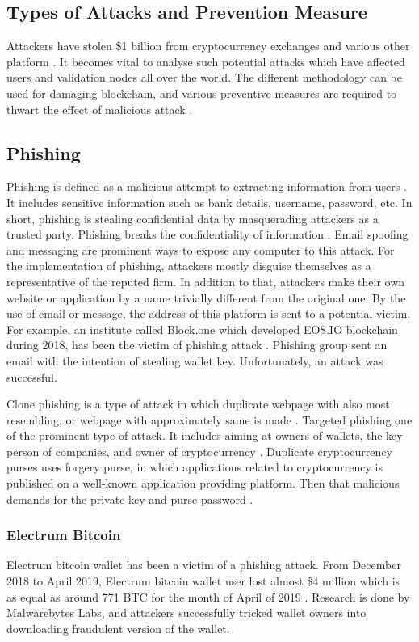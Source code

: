 \documentclass[a4paper,twoside,12pt]{report}
\begin{document}
\begin{spacing}{1.5}
\section{Types of Attacks and Prevention Measure}
\label{typesofattacks}
Attackers have stolen \$1 billion from cryptocurrency exchanges and various other platform \cite{topfiveblockchainsecurityissues}. It becomes vital to analyse such potential attacks which have affected users and validation nodes all over the world. The different methodology can be used for damaging blockchain, and various preventive measures are required to thwart the effect of malicious attack \cite{blockchainthreatreport}. 
\subsection{Phishing}
Phishing is defined as a malicious attempt to extracting information from users \cite{wiki:phishing}. It includes sensitive information such as bank details, username, password, etc. In short, phishing is stealing confidential data by masquerading attackers as a trusted party. Phishing breaks the confidentiality of information \cite{andryukhinphishing}. Email spoofing and messaging are prominent ways to expose any computer to this attack. For the implementation of phishing, attackers mostly disguise themselves as a representative of the reputed firm. In addition to that, attackers make their own website or application by a name trivially different from the original one. By the use of email or message, the address of this platform is sent to a potential victim. For example, an institute called Block.one which developed EOS.IO blockchain during 2018, has been the victim of phishing attack \cite{wiki:phishing}. Phishing group sent an email with the intention of stealing wallet key. Unfortunately, an attack was successful. 
\par
Clone phishing is a type of attack in which duplicate webpage with also most resembling, or webpage with approximately same is made \cite{andryukhinphishing,phishingkaspersky}. Targeted phishing one of the prominent type of attack. It includes aiming at owners of wallets, the key person of companies, and owner of cryptocurrency \cite{aimedphising,andryukhinphishing}. Duplicate cryptocurrency purses uses forgery purse, in which applications related to cryptocurrency is published on a well-known application providing platform. Then that malicious demands for the private key and purse password \cite{andryukhinphishing}.          
\subsubsection{Electrum Bitcoin}
Electrum bitcoin wallet has been a victim of a phishing attack. From December 2018 to April 2019, Electrum bitcoin wallet user lost almost \$4 million which is as equal as around 771 BTC for the month of April of 2019
\cite{phishing_perez_behind_2019}. Research is done by Malwarebytes Labs, and attackers successfully tricked wallet owners into downloading fraudulent version of the wallet.  

\end{spacing}
\end{document}
